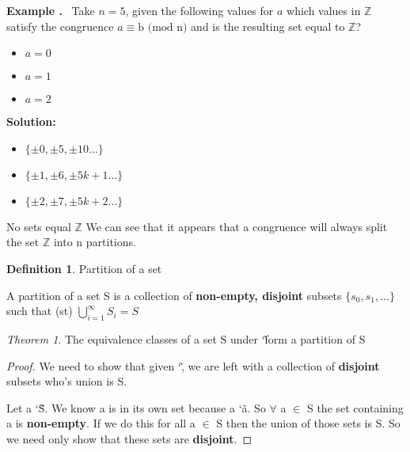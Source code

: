 \documentclass{article}
\newcounter{example}
\newcounter{solution}
\theoremstyle{definition}
\newtheorem{definition}{Definition}[section]
\theoremstyle{claim}
\theoremstyle{remark}
\newtheorem{theorem}{Theorem}
\newcommand\Example{%
  \stepcounter{example}%
  \textbf{Example \theexample.}~%
  \setcounter{solution}{0}%
}
\newcommand\TheSolution{%
  \textbf{Solution:}\\%
}
\begin{document}
\begin{flushleft}
\newline
\newline
\Example Take $n = 5$, given the following values for $a$ which values in $\mathbb{Z}$ satisfy the congruence $a \equiv \text{b (mod n)}$ and is the resulting set equal to $\mathbb{Z}$?
\begin{itemize}
     \item $a = 0$
     \item $a = 1$
     \item $a = 2$
\end{itemize}
\TheSolution 
\begin{itemize}
     \item $\{\pm{0}, \pm{5}, \pm{10}\dots\}$
     \item $\{\pm{1}, \pm{6}, \pm{5k+1}\dots\}$
     \item $\{\pm{2}, \pm{7}, \pm{5k+2}\dots\}$
\end{itemize}
No sets equal $\mathbb{Z}$
\newline
\newline
We can see that it appears that a congruence will always split the set $\mathbb{Z}$ into n partitions.
\newline
\begin{definition}{Partition of a set}

A partition of a set S is a collection of \textbf{non-empty, disjoint} subsets $\{s_{0}, s_{1}, \dots\}$ such that (st) $\bigcup\limits_{i=1}^{\infty} S_{i} = S$

\end{definition}
\begin{theorem}{The equivalence classes of a set S under \char`\~ form a partition of S}
\begin{proof}{
We need to show that given \char`\~, we are left with a collection of \textbf{disjoint} subsets who's union is S.

Let a \char`\~ S. We know a is in  its own set because a \char`\~ a. So $\forall$ a $\in$ S the set containing a is \textbf{non-empty}. If we do this for all a $\in$ S then the union of those sets is S. So we need only show that these sets are \textbf{disjoint}.
}
\end{proof}
\end{theorem}


\end{flushleft}
\end{document}
